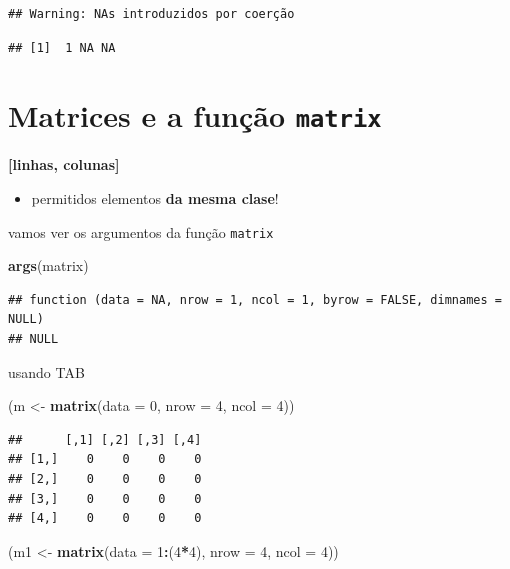 \documentclass[]{book}
\newenvironment{Shaded}{\begin{snugshade}}{\end{snugshade}}
\newcommand{\KeywordTok}[1]{\textcolor[rgb]{0.13,0.29,0.53}{\textbf{#1}}}
\newcommand{\DataTypeTok}[1]{\textcolor[rgb]{0.13,0.29,0.53}{#1}}
\newcommand{\DecValTok}[1]{\textcolor[rgb]{0.00,0.00,0.81}{#1}}
\newcommand{\StringTok}[1]{\textcolor[rgb]{0.31,0.60,0.02}{#1}}
\newcommand{\OperatorTok}[1]{\textcolor[rgb]{0.81,0.36,0.00}{\textbf{#1}}}
\newcommand{\NormalTok}[1]{#1}
\providecommand{\tightlist}{%
  \setlength{\itemsep}{0pt}\setlength{\parskip}{0pt}}
\theoremstyle{definition}
\theoremstyle{definition}
\theoremstyle{definition}
\theoremstyle{remark}
\begin{document}
\begin{verbatim}
## Warning: NAs introduzidos por coerção
\end{verbatim}

\begin{verbatim}
## [1]  1 NA NA
\end{verbatim}

\section{\texorpdfstring{Matrices e a função
\texttt{matrix}}{Matrices e a função matrix}}\label{matrices-e-a-funcao-matrix}

\textbf{{[}linhas, colunas{]}}

\begin{itemize}
\tightlist
\item
  permitidos elementos \textbf{da mesma clase}!
\end{itemize}

vamos ver os argumentos da função \texttt{matrix}

\begin{Shaded}
\begin{Highlighting}[]
\KeywordTok{args}\NormalTok{(matrix)}
\end{Highlighting}
\end{Shaded}

\begin{verbatim}
## function (data = NA, nrow = 1, ncol = 1, byrow = FALSE, dimnames = NULL) 
## NULL
\end{verbatim}

usando TAB

\begin{Shaded}
\begin{Highlighting}[]
\NormalTok{(m <-}\StringTok{ }\KeywordTok{matrix}\NormalTok{(}\DataTypeTok{data =} \DecValTok{0}\NormalTok{, }\DataTypeTok{nrow =} \DecValTok{4}\NormalTok{, }\DataTypeTok{ncol =} \DecValTok{4}\NormalTok{))}
\end{Highlighting}
\end{Shaded}

\begin{verbatim}
##      [,1] [,2] [,3] [,4]
## [1,]    0    0    0    0
## [2,]    0    0    0    0
## [3,]    0    0    0    0
## [4,]    0    0    0    0
\end{verbatim}

\begin{Shaded}
\begin{Highlighting}[]
\NormalTok{(m1 <-}\StringTok{ }\KeywordTok{matrix}\NormalTok{(}\DataTypeTok{data =} \DecValTok{1}\OperatorTok{:}\NormalTok{(}\DecValTok{4}\OperatorTok{*}\DecValTok{4}\NormalTok{), }\DataTypeTok{nrow =} \DecValTok{4}\NormalTok{, }\DataTypeTok{ncol =} \DecValTok{4}\NormalTok{))}
\end{Highlighting}
\end{Shaded}
\end{document}
